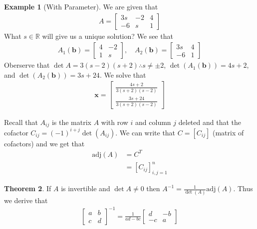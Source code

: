 \documentclass{article}
\numberwithin{equation}{section}
\theoremstyle{definition}
\newtheorem{thm}{Theorem}[subsection]
\newtheorem{ex}[thm]{Example}
\newcommand{\R}{\mathbb{R}}
\theoremstyle{adefn}
\begin{document}
	\begin{ex}[With Parameter]
		We are given that 
		\begin{align*}
			A = \begin{bmatrix}
				3s & -2 & 4 \\ 
				-6 & s & 1
			\end{bmatrix}
		\end{align*}
		What $s \in \R$ will give us a unique solution? We see that 
		\begin{align*}
			A_1(\mathbf{b}) = \begin{bmatrix}
				4 & -2 \\ 1 & s
			\end{bmatrix},\quad A_2(\mathbf{b}) = \begin{bmatrix}
			3s & 4 \\ -6 & 1
			\end{bmatrix}
		\end{align*}
		Oberserve that $\det A = 3(s-2)(s+2) \therefore s \neq \pm 2$, $\det(A_1(\mathbf{b})) = 4s + 2$, and $\det(A_2(\mathbf{b})) = 3s + 24$. We solve that 
		\begin{align*}
			\mathbf{x} = \begin{bmatrix}
				\frac{4s+2}{3(s+2)(s-2)} \\ 
				\frac{3s+24}{3(s+2)(s-2)}
			\end{bmatrix}
		\end{align*}
	\end{ex}
	Recall that $A_{ij}$ is the matrix $A$ with row $i$ and column $j$ deleted and that the cofactor $C_{ij} = (-1)^{i+j}\det(A_{ij})$. We can write that $C = [ C_{ij} ]$ (matrix of cofactors) and we get that
	\begin{align*}
		\text{adj}(A) &= C^T\\
		&= [ C_{ij} ]^n_{i,j = 1}
	\end{align*}
	\begin{thm}
		If $A$ is invertible and $\det A \neq 0$ then $A^{-1} = \frac{1}{\det(A)}\text{adj}(A)$. Thus we derive that \begin{align*}
			\begin{bmatrix}
				a & b \\ c & d
			\end{bmatrix}^{-1} = \frac{1}{ad-bc}\begin{bmatrix}
			d & -b \\ -c & a
			\end{bmatrix}
		\end{align*}
	\end{thm}
\end{document}
